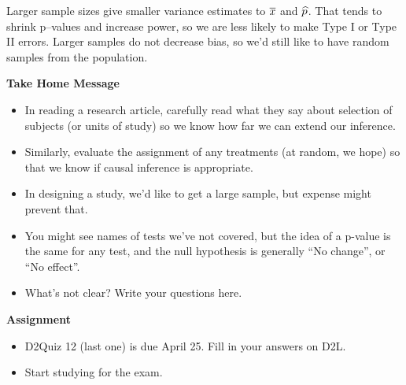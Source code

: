 \begin{enumerate}
\begin{students}
 \vspace{4cm}
\end{students}

\begin{key}
   Larger sample sizes give smaller variance estimates to $\overline{x}$ and
   $\widehat{p}$.  That tends to shrink p--values and increase power, so we
   are less likely to make Type I or Type II errors. Larger samples do
   not decrease bias, so we'd still like to have random samples from
   the population.
\end{key}


\end{enumerate}


\begin{center}
  {\large\bf Take Home Message}
\end{center}

\begin{itemize}
\item  In reading a research article, carefully read what they say
  about selection of subjects (or units of study) so we know how far
  we can extend our inference.
\item Similarly, evaluate the assignment of any treatments (at random,
  we hope) so that we know if causal inference is appropriate.
\item In designing a study, we'd like to get a large sample, but
  expense might prevent that.
\item You might see names of tests we've not covered, but the idea of
  a p-value is the same for any test, and the null hypothesis is
  generally ``No change'', or ``No effect''.
\item What's not clear?  Write your questions here.
  \vfill
\end{itemize}


\begin{center}
  {\large\bf Assignment}
\end{center}

\begin{itemize}
\item D2Quiz 12 (last one) is due April 25.  Fill in your answers on D2L.
\item Start studying for the exam.
\end{itemize}


